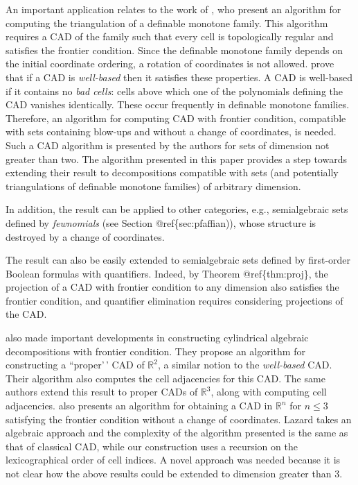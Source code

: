 \documentclass[
]{book}
\theoremstyle{definition}
\theoremstyle{definition}
\theoremstyle{definition}
\theoremstyle{definition}
\theoremstyle{remark}
\begin{document}
An important application relates to the work of \citet{bgv15}, who present an algorithm for computing the triangulation of a definable monotone family. This algorithm requires a CAD of the family such that every cell is topologically regular and satisfies the frontier condition. Since the definable monotone family depends on the initial coordinate ordering, a rotation of coordinates is not allowed. \citet{jhd20} prove that if a CAD is \emph{well-based} then it satisfies these properties.
A CAD is well-based if it contains no \emph{bad cells}: cells above which one of the polynomials defining the CAD vanishes identically. These occur frequently in definable monotone families. Therefore, an algorithm for computing CAD with frontier condition, compatible with sets containing blow-ups and without a change of coordinates, is needed. Such a CAD algorithm is presented by the authors for sets of dimension not greater than two. \citep{bgv15} The algorithm presented in this paper provides a step towards extending their result to decompositions compatible with sets (and potentially triangulations of definable monotone families) of arbitrary dimension.

In addition, the result can be applied to other categories, e.g., semialgebraic sets defined by \emph{fewnomials} (see Section @ref\{sec:pfaffian)), whose structure is destroyed by a change of coordinates.

The result can also be easily extended to semialgebraic sets defined by first-order Boolean formulas with quantifiers.
Indeed, by Theorem @ref\{thm:proj\}, the projection of a CAD with frontier condition to any dimension also satisfies the frontier condition, and quantifier elimination requires considering projections of the CAD.

\citet{arnon1984} also made important developments in constructing cylindrical algebraic decompositions with frontier condition. They propose an algorithm for constructing a ``proper'\,' CAD of \(\mathbb{R}^2\), a similar notion to the \emph{well-based} CAD. Their algorithm also computes the cell adjacencies for this CAD.
The same authors extend this result to proper CADs of \(\mathbb{R}^3\), along with computing cell adjacencies.\citep{arnon1987}
\citet{lazard10} also presents an algorithm for obtaining a CAD in \(\mathbb{R}^n\) for \(n \le 3\) satisfying the frontier condition without a change of coordinates. Lazard takes an algebraic approach and the complexity of the algorithm presented is the same as that of classical CAD, while our construction uses a recursion on the lexicographical order of cell indices. A novel approach was needed because it is not clear how the above results could be extended to dimension greater than \(3\).
\end{document}
